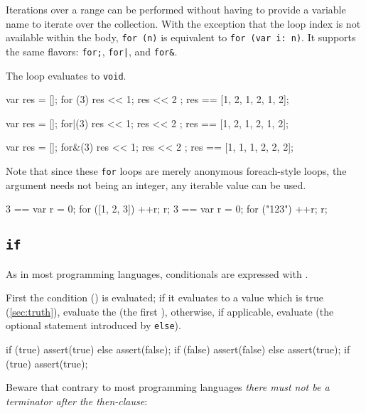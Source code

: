 Iterations over a range can be performed without having to provide a
variable name to iterate over the collection.  With the exception that the
loop index is not available within the body, \lstinline|for (n)| is
equivalent to \lstinline|for (var i: n)|.  It supports the same flavors:
\lstinline|for;|, \lstinline{for|}, and \lstinline|for&|.


The loop evaluates to \lstinline{void}.

\begin{urbiassert}
{ var res = []; for (3) { res << 1; res << 2 } ; res }
        == [1, 2, 1, 2, 1, 2];

{ var res = []; for|(3) { res << 1; res << 2 } ; res }
        == [1, 2, 1, 2, 1, 2];

{ var res = []; for&(3) { res << 1; res << 2 } ; res }
        == [1, 1, 1, 2, 2, 2];
\end{urbiassert}

Note that since these \lstinline{for} loops are merely anonymous
foreach-style loops, the argument needs not being an integer, any iterable
value can be used.

\begin{urbiassert}
3 == { var r = 0; for ([1, 2, 3]) ++r; r};
3 == { var r = 0; for ("123")     ++r; r};
\end{urbiassert}


\subsection{\lstinline{if}}
\label{sec:lang:if}
As in most programming languages, conditionals are expressed with
.


First the condition () is evaluated; if it evaluates to a
value which is true (\autoref{sec:truth}), evaluate the 
(the first ), otherwise, if applicable, evaluate
 (the optional statement introduced by \lstinline{else}).

\begin{urbiscript}
if (true)  assert(true) else assert(false);
if (false) assert(false) else assert(true);
if (true)  assert(true);
\end{urbiscript}

Beware that contrary to most programming languages \emph{there must not be a
  terminator after the then-clause}:

